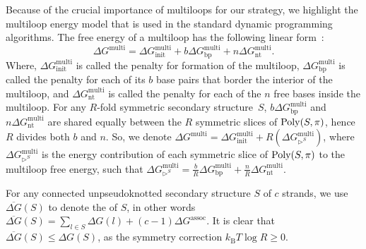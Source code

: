 Because of the crucial importance of multiloops for our strategy, we highlight the multiloop energy model that is used in the standard dynamic programming algorithms. The free energy of a multiloop has the following linear form~\cite{dirks2007thermodynamic}:
\begin{equation} \label{eq:multi}
	\Delta G^ \textrm{multi}  = \Delta G_\textrm{init}^\textrm{multi} + b \Delta G_\textrm{bp}^\textrm{multi} + n\Delta G_\textrm{nt}^\textrm{multi}.
\end{equation}
Where, $\Delta G_\textrm{init}^\textrm{multi}$ is called the penalty for   formation of the multiloop, $\Delta G_\textrm{bp}^\textrm{multi}$ is called the penalty for each of its $b$ base pairs that border the interior of the multiloop, and $\Delta G_\textrm{nt}^\textrm{multi}$ is called the penalty for each of the $n$ free bases inside the multiloop. For any $R$-fold symmetric secondary structure~$S$, 
$b \Delta G_\textrm{bp}^\textrm{multi}$ and $n\Delta G_\textrm{nt}^\textrm{multi}$ are shared equally between the $R$ symmetric slices of $\mathrm{Poly}(S,\pi)$, hence $R$ divides both $b$ and $n$. So, we denote  $\Delta G^ \textrm{multi}  = \Delta G_\textrm{init}^\textrm{multi} + R(\Delta G_{\rhd^{S}}^\textrm{multi})$, where $\Delta G_{\rhd^{S}}^\textrm{multi}$ is the energy contribution of each symmetric slice of $\mathrm{Poly}(S,\pi)$ to the multiloop free energy, such that $\Delta G_{\rhd^{S}}^\textrm{multi} = \frac{b}{R} \Delta G_\textrm{bp}^\textrm{multi} + \frac{n}{R} \Delta G_\textrm{nt}^\textrm{multi}$.

\begin{note}
	For any connected unpseudoknotted secondary structure $S$ of $c$ strands, we use $\overline{\Delta G}(S)$ to denote the \snMFE of $S$, in other words $\overline{\Delta G}(S) = \sum_{l\in S} \Delta G(l)
	+  (c-1)\Delta G^{\textrm{assoc}}$. It is clear that $\overline{\Delta G}(S) \leq \Delta G(S)$, as the symmetry correction $k_\mathrm{B} T \log R \geq 0$. 
\end{note}



